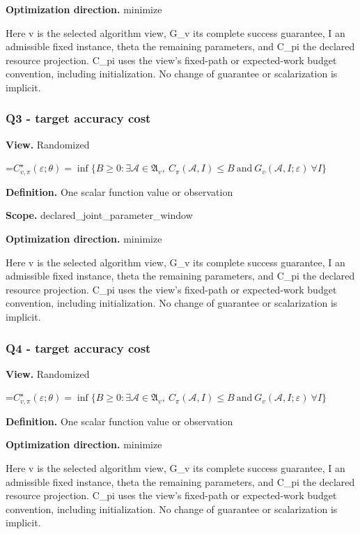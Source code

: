 \documentclass[10pt,a4paper]{article}
\newcommand{\AtlasMath}[1]{\par\begingroup\centering\setbox0=\hbox{$\displaystyle #1$}\ifdim\wd0>1.4\linewidth\typeout{ATLAS WIDE FORMULA: \the\wd0}\fi\ifdim\wd0>\linewidth\resizebox{\linewidth}{!}{\box0}\else\box0\fi\par\endgroup}
\begin{document}
\textbf{Optimization direction.} minimize

Here v is the selected algorithm view, G\_v its complete success guarantee, I an admissible fixed instance, theta the remaining parameters, and C\_pi the declared resource projection. C\_pi uses the view's fixed-path or expected-work budget convention, including initialization. No change of guarantee or scalarization is implicit.

\subsubsection{Q3 - target accuracy cost}
\textbf{View.} Randomized

\AtlasMath{C^\star_{v,\pi}(\varepsilon;\theta)=\inf\{B\ge0:\exists\mathcal A\in\mathfrak A_v,\ C_\pi(\mathcal A,I)\le B\ \text{and}\ G_v(\mathcal A,I;\varepsilon)\ \forall I\}}
\textbf{Definition.} One scalar function value or observation

\textbf{Scope.} declared\_joint\_parameter\_window

\textbf{Optimization direction.} minimize

Here v is the selected algorithm view, G\_v its complete success guarantee, I an admissible fixed instance, theta the remaining parameters, and C\_pi the declared resource projection. C\_pi uses the view's fixed-path or expected-work budget convention, including initialization. No change of guarantee or scalarization is implicit.

\subsubsection{Q4 - target accuracy cost}
\textbf{View.} Randomized

\AtlasMath{C^\star_{v,\pi}(\varepsilon;\theta)=\inf\{B\ge0:\exists\mathcal A\in\mathfrak A_v,\ C_\pi(\mathcal A,I)\le B\ \text{and}\ G_v(\mathcal A,I;\varepsilon)\ \forall I\}}
\textbf{Definition.} One scalar function value or observation

\textbf{Optimization direction.} minimize

Here v is the selected algorithm view, G\_v its complete success guarantee, I an admissible fixed instance, theta the remaining parameters, and C\_pi the declared resource projection. C\_pi uses the view's fixed-path or expected-work budget convention, including initialization. No change of guarantee or scalarization is implicit.
\end{document}
